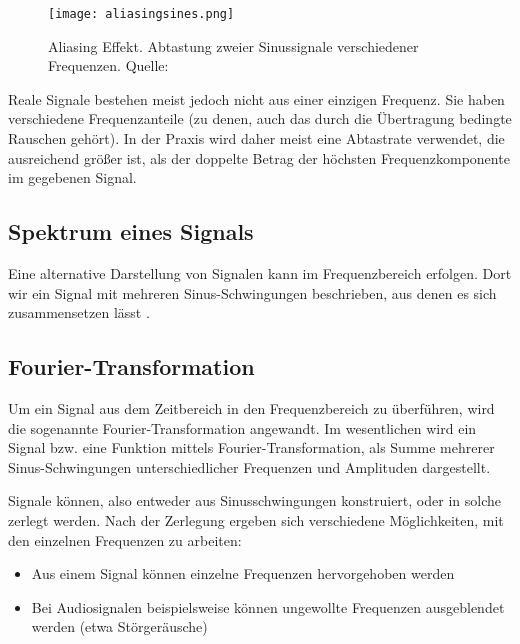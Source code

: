 \begin{figure}[ht]
	\centering
	\texttt{[image: aliasingsines.png]}
	\caption[Aliasing Effekt. Abtastung zweier Sinussignale verschiedener Frequenzen]{Aliasing Effekt. Abtastung zweier Sinussignale verschiedener Frequenzen. \newline Quelle: \cite[Moxfyre]{aliasingsampling:2009}} 
	\label{abtasttheorem}
\end{figure}

Reale Signale bestehen meist jedoch nicht aus einer einzigen Frequenz. Sie haben verschiedene Frequenzanteile (zu denen, auch das durch die Übertragung bedingte Rauschen gehört).
In der Praxis wird daher meist eine Abtastrate verwendet, die ausreichend größer ist, als der doppelte Betrag der höchsten Frequenzkomponente im gegebenen Signal.





\subsection{Spektrum eines Signals}
Eine alternative Darstellung von Signalen kann im Frequenzbereich erfolgen. Dort wir ein Signal mit mehreren Sinus-Schwingungen beschrieben, aus denen es sich zusammensetzen lässt \cite[vgl. Karrenberg, S. 42]{Karrenberg:2017}.





\subsection{Fourier-Transformation}
Um ein Signal aus dem Zeitbereich in den Frequenzbereich zu überführen, wird die sogenannte Fourier-Transformation angewandt.\newline
Im wesentlichen wird ein Signal bzw. eine Funktion mittels Fourier-Transformation, als Summe mehrerer Sinus-Schwingungen unterschiedlicher Frequenzen und Amplituden dargestellt.

Signale können, also entweder aus Sinusschwingungen konstruiert, oder in solche zerlegt werden.
Nach der Zerlegung ergeben sich verschiedene Möglichkeiten, mit den einzelnen Frequenzen zu arbeiten:
\begin{itemize}
	\item Aus einem Signal können einzelne Frequenzen hervorgehoben werden
	\item Bei Audiosignalen beispielsweise können ungewollte Frequenzen ausgeblendet werden (etwa Störgeräusche)
\end{itemize}

